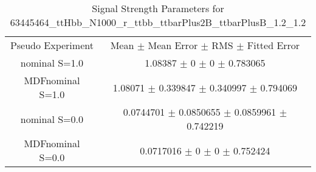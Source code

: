 \begin{table}
\centering
\caption{Signal Strength Parameters for 63445464\_ttHbb\_N1000\_r\_ttbb\_ttbarPlus2B\_ttbarPlusB\_1.2\_1.2}
\begin{tabular}{cc}
\toprule
Pseudo Experiment & Mean $\pm$ Mean Error $\pm$ RMS $\pm$ Fitted Error\\
nominal S=1.0 & \num{1.08387} $\pm$ \num{0} $\pm$ \num{0} $\pm$ \num{0.783065}\\
MDFnominal S=1.0 & \num{1.08071} $\pm$ \num{0.339847} $\pm$ \num{0.340997} $\pm$ \num{0.794069}\\
nominal S=0.0 & \num{0.0744701} $\pm$ \num{0.0850655} $\pm$ \num{0.0859961} $\pm$ \num{0.742219}\\
MDFnominal S=0.0 & \num{0.0717016} $\pm$ \num{0} $\pm$ \num{0} $\pm$ \num{0.752424}\\
\bottomrule
\end{tabular}
\end{table}